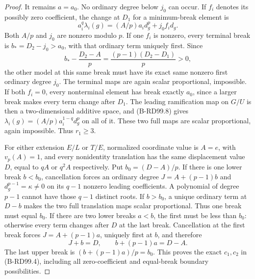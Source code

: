 \begin{proof}
It remains $a=a_0$. No ordinary degree below $j_0$ can occur.
If $f_i$ denotes its possibly zero coefficient, the change at
$D_1$ for a minimum-break element is
\[
 a_i^q\lambda_i(g)=(A/p)a_i d_g^p+j_0 f_i d_g.
                                                        \tag{B-RD99.8}
\]
Both $A/p$ and $j_0$ are nonzero modulo $p$. If one $f_i$
is nonzero, every terminal break is $b_*=D_2-j_0>a_0$,
with that ordinary term uniquely first. Since
\[
 b_*-\frac{D_2-A}{p}
                  =\frac{(p-1)(D_2-D_1)}p>0,          \tag{B-RD99.9}
\]
the other model at this same break must have its exact same
nonzero first ordinary degree $j_0$. The terminal maps are
again scalar proportional, impossible. If both $f_i=0$,
every nonterminal element has break exactly $a_0$, since a
larger break makes every term change after $D_1$. The leading
ramification map on $G/U$ is then a two-dimensional additive
space, and (B-RD99.8) gives
$\lambda_i(g)=(A/p)a_i^{1-q}d_g^p$ on all of it.
These two full maps are scalar proportional, again impossible.
Thus $r_1\ge3$.

For either extension $E/L$ or $T/E$, normalized coordinate
value is $A=e$, with $v_p(A)=1$, and every nonidentity
translation has the same displacement value $D$, equal to
$qA$ or $q^2A$ respectively. Put $b_0=(D-A)/p$.
If there is one lower break $b<b_0$, cancellation forces an
ordinary degree $J=A+(p-1)b$ and $d_g^{p-1}=\kappa\ne0$
on its $q-1$ nonzero leading coefficients. A polynomial of
degree $p-1$ cannot have those $q-1$ distinct roots.
If $b>b_0$, a unique ordinary term at $D-b$ makes the two
full translation maps scalar proportional. Thus one break
must equal $b_0$.
If there are two lower breaks $a<b$, the first must be
less than $b_0$: otherwise every term changes after $D$ at
the last break. Cancellation at the first break forces
$J=A+(p-1)a$, uniquely first at $b$, and therefore
\[
 J+b=D,\qquad b+(p-1)a=D-A.
                                                        \tag{B-RD99.10}
\]
The last upper break is $(b+(p-1)a)/p=b_0$. This proves
the exact $c_1,c_2$ in (B-RD99.4), including all zero-coefficient
and equal-break boundary possibilities.


\end{proof}
